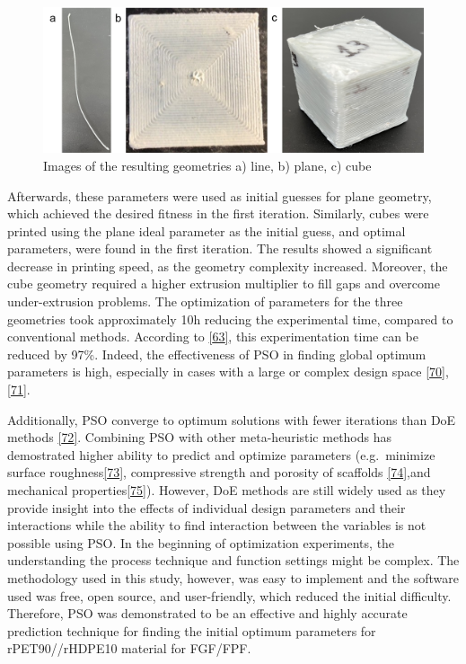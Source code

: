 \documentclass[
]{article}
\begin{document}
\begin{figure}

{\centering \includegraphics{figures/Figure_9_geometries.png}

}

\caption{\label{fig-geometries}Images of the resulting geometries a)
line, b) plane, c) cube}

\end{figure}

Afterwards, these parameters were used as initial guesses for plane
geometry, which achieved the desired fitness in the first iteration.
Similarly, cubes were printed using the plane ideal parameter as the
initial guess, and optimal parameters, were found in the first
iteration. The results showed a significant decrease in printing speed,
as the geometry complexity increased. Moreover, the cube geometry
required a higher extrusion multiplier to fill gaps and overcome
under-extrusion problems. The optimization of parameters for the three
geometries took approximately 10h reducing the experimental time,
compared to conventional methods. According to
\protect\hyperlink{ref-oberloier2022}{{[}63{]}}, this experimentation
time can be reduced by 97\%. Indeed, the effectiveness of PSO in finding
global optimum parameters is high, especially in cases with a large or
complex design space \protect\hyperlink{ref-saad2019a}{{[}70{]}},
\protect\hyperlink{ref-selvam2020}{{[}71{]}}.

Additionally, PSO converge to optimum solutions with fewer iterations
than DoE methods \protect\hyperlink{ref-zhang2015}{{[}72{]}}. Combining
PSO with other meta-heuristic methods has demostrated higher ability to
predict and optimize parameters (e.g.~minimize surface
roughness\protect\hyperlink{ref-shirmohammadi2021}{{[}73{]}},
compressive strength and porosity of scaffolds
\protect\hyperlink{ref-asadi-eydivand2016}{{[}74{]}},and mechanical
properties\protect\hyperlink{ref-raju2019}{{[}75{]}}). However, DoE
methods are still widely used as they provide insight into the effects
of individual design parameters and their interactions while the ability
to find interaction between the variables is not possible using PSO. In
the beginning of optimization experiments, the understanding the process
technique and function settings might be complex. The methodology used
in this study, however, was easy to implement and the software used was
free, open source, and user-friendly, which reduced the initial
difficulty. Therefore, PSO was demonstrated to be an effective and
highly accurate prediction technique for finding the initial optimum
parameters for rPET90//rHDPE10 material for FGF/FPF.
\end{document}
